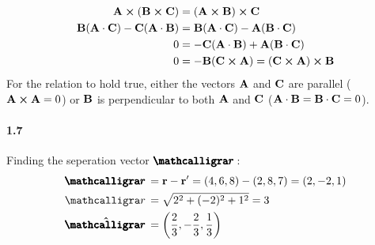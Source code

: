 \documentclass[../main.tex]{subfiles}
\begin{document}
\begin{align*}
    \vb{A} \cp (\vb{B} \cp \vb{C}) &= (\vb{A} \cp \vb{B}) \cp \vb{C} \\
    \vb{B} (\vb{A} \cdot \vb{C}) - \vb{C} (\vb{A} \cdot \vb{B}) &=
    \vb{B} (\vb{A} \cdot \vb{C}) - \vb{A} (\vb{B} \cdot \vb{C}) \\
    0 &= -\vb{C} (\vb{A} \cdot \vb{B}) + \vb{A} (\vb{B} \cdot \vb{C}) \\
    0 &= -\vb{B} (\vb{C} \cp \vb{A}) = (\vb{C} \cp \vb{A}) \cp \vb{B}
\end{align*}
For the relation to hold true, either the vectors $\vb{A}$ and $\vb{C}$  are parallel
($\vb{A} \cp \vb{A} = 0$) or $\vb{B}$ is perpendicular to both $\vb{A}$ and $\vb{C}$
($\vb{A} \cdot \vb{B} = \vb{B} \cdot \vb{C} = 0$).

\paragraph{1.7}
Finding the seperation vector $\boldscriptr$:
\begin{align*}
    \boldscriptr &= \vb{r} - \vb{r}' = (4, 6, 8) - (2, 8, 7) = (2, -2, 1) \\
    \scriptr &= \sqrt{2^2 + (-2)^2 + 1^2} = 3 \\
    \vu{\boldscriptr} &= \quantity(\frac{2}{3}, -\frac{2}{3}, \frac{1}{3})
\end{align*}
\end{document}
